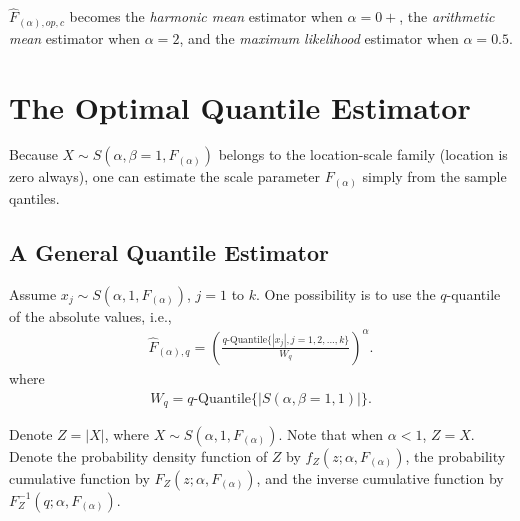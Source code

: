 \documentclass[oneside,10pt]{article}
\begin{document}
$\hat{F}_{(\alpha),op,c}$ becomes the {\em harmonic mean} estimator when $\alpha =0+$, the {\em arithmetic mean} estimator when $\alpha = 2$, and the {\em maximum likelihood} estimator when $\alpha = 0.5$.

\section{The Optimal Quantile Estimator}

Because $X \sim S\left(\alpha,\beta=1,F_{(\alpha)}\right)$ belongs to the location-scale family (location is zero always), one can estimate the scale parameter $F_{(\alpha)}$ simply from the sample qantiles.

\subsection{A General Quantile Estimator}
Assume $x_j \sim S\left(\alpha, 1, F_{(\alpha)}\right)$, $j = 1$ to $k$.  One possibility is to use the $q$-quantile of the absolute values, i.e.,
\begin{align}\label{eqn_quantile}
\hat{F}_{(\alpha),q} = \left(\frac{q\text{-Quantile}\{|x_j|, j = 1, 2, ..., k\}}{W_q}\right)^\alpha.
\end{align}
where
\begin{align}\label{eqn_W}
W_q = q\text{-Quantile}\{|S(\alpha,\beta=1,1)|\}.
\end{align}

Denote $Z = |X|$, where $X\sim S\left(\alpha,1,F_{(\alpha)}\right)$. Note that when $\alpha <1$, $Z=X$. Denote the probability density function of $Z$ by $f_Z\left(z;\alpha,F_{(\alpha)}\right)$, the probability cumulative function by $F_Z\left(z;\alpha,F_{(\alpha)}\right)$, and the inverse cumulative function by $F_Z^{-1}\left(q;\alpha,F_{(\alpha)}\right)$.
\end{document}
